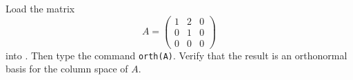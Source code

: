\documentclass{ximera}
\begin{document}
\begin{computerExercise} \label{c7.4.3}
Load the matrix
\[
A=\left(\begin{array}{rrr} 1 & 2 & 0\\ 0 & 1 & 0\\
0 & 0 & 0\end{array}\right)
\]
into \Matlabp.  Then type the command {\tt orth(A)}.
Verify that the result is an orthonormal basis for the column space of $A$.

\begin{solution}



\end{solution}
\end{computerExercise}
\end{document}
